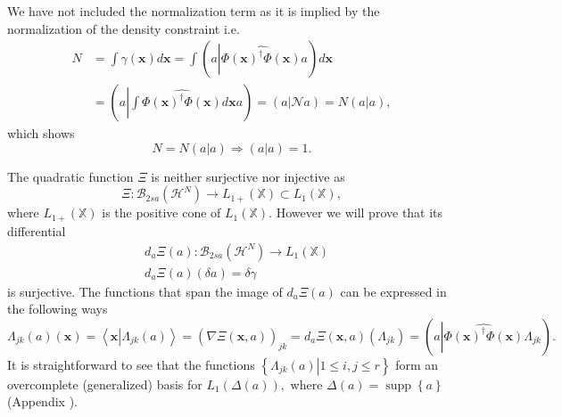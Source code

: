 \documentclass[aps,preprint]{revtex4}%
\begin{document}
We have not included the normalization term as it is implied by the
normalization of the density constraint i.e.
\begin{align}
N  &  =\int\gamma\left(  \mathbf{x}\right)  d\mathbf{x=}\int\left(
a\left\vert \widehat{\Phi\left(  \mathbf{x}\right)  ^{\dagger}\Phi\left(
\mathbf{x}\right)  }\right.  a\right)  d\mathbf{x}\nonumber\\
&  =\left(  a\left\vert \int\widehat{\Phi\left(  \mathbf{x}\right)  ^{\dagger
}\Phi\left(  \mathbf{x}\right)  }d\mathbf{x}\right.  a\right)  =\left(
a\left\vert \mathcal{N}\right.  a\right)  =N\left(  a\left\vert \overset{}{a}%
\right.  \right)  ,
\end{align}
which shows
\begin{equation}
N=N\left(  a\left\vert \overset{}{a}\right.  \right)  \Rightarrow\left(
a\left\vert \overset{}{a}\right.  \right)  =1.
\end{equation}


The quadratic function $\Xi$ is neither surjective nor injective as
\begin{equation}
\Xi:\mathcal{B}_{2sa}\left(  \mathcal{H}^{N}\right)  \rightarrow L_{1+}\left(
\mathbb{X}\right)  \subset L_{1}\left(  \mathbb{X}\right)  ,
\end{equation}
where $L_{1+}\left(  \mathbb{X}\right)  $ is the positive cone of
$L_{1}\left(  \mathbb{X}\right)  .$ However we will prove that its
differential
\begin{align}
&  d_{a}\Xi\left(  a\right)  :\mathcal{B}_{2sa}\left(  \mathcal{H}^{N}\right)
\rightarrow L_{1}\left(  \mathbb{X}\right)  \nonumber\\
&  d_{a}\Xi\left(  a\right)  \left(  \delta a\right)  =\delta\gamma
\end{align}
is surjective. The functions that span the image of $d_{a}\Xi\left(  a\right)
$ can be expressed in the following ways
\begin{equation}
\Lambda_{jk}\left(  a\right)  \left(  \mathbf{x}\right)  =\left\langle
\mathbf{x}\left\vert \Lambda_{jk}\left(  a\right)  \right.  \right\rangle
=\left(  \overset{}{\nabla\Xi\left(  \mathbf{x,}a\right)  }\right)
_{jk}=d_{a}\Xi\left(  \mathbf{x,}a\right)  \left(  \Lambda_{jk}\right)
=\left(  a\left\vert \widehat{\Phi\left(  \mathbf{x}\right)  ^{\dagger}%
\Phi\left(  \mathbf{x}\right)  }\right.  \Lambda_{jk}\right)  .
\end{equation}
It is straightforward to see that the functions $\left\{  \left.  \Lambda
_{jk}\left(  a\right)  \right\vert 1\leq i,j\leq r\right\}  $ form an
overcomplete (generalized) basis for $L_{1}\left(  \mathbb{\Delta}\left(
a\right)  \right)  ,$ where $\mathbb{\Delta}\left(  a\right)
=\operatorname*{supp}\left\{  a\right\}  $ (Appendix ).
\end{document}
